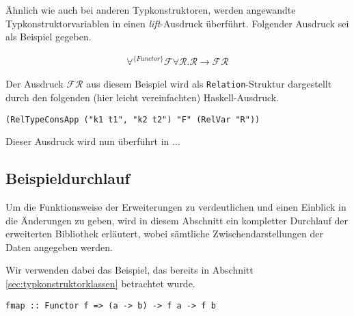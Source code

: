 Ähnlich wie auch bei anderen Typkonstruktoren, werden angewandte Typkonstruktorvariablen in einen \textit{lift}-Ausdruck
überführt. Folgender Ausdruck sei als Beispiel gegeben.

\begin{align*}
\forall^{\{Functor\}} \mathcal{F} \forall \mathcal{R} . \mathcal{R} \rightarrow \mathcal{F} \mathcal{R}
\end{align*}

Der Ausdruck $\mathcal{F} \mathcal{R}$ aus diesem Beispiel wird als \texttt{Relation}-Struktur dargestellt durch den folgenden
(hier leicht vereinfachten) Haskell-Ausdruck.

\begin{verbatim}
(RelTypeConsApp ("k1 t1", "k2 t2") "F" (RelVar "R"))
\end{verbatim}

Dieser Ausdruck wird nun überführt in ...


\subsection{Beispieldurchlauf}

Um die Funktionsweise der Erweiterungen zu verdeutlichen und einen Einblick in die Änderungen zu geben, wird in diesem Abschnitt
ein kompletter Durchlauf der erweiterten Bibliothek erläutert, wobei sämtliche Zwischendarstellungen der Daten angegeben werden.

Wir verwenden dabei das Beispiel, das bereits in Abschnitt \ref{sec:typkonstruktorklassen} betrachtet wurde.

\begin{verbatim}
fmap :: Functor f => (a -> b) -> f a -> f b
\end{verbatim}

